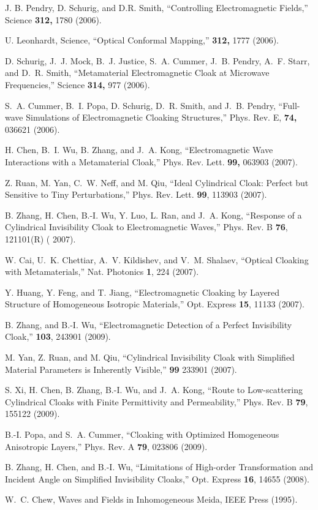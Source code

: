 \documentclass[a4paper, 12pt]{article}
\begin{document}
\begin{thebibliography}{99}

 J. B. Pendry, D. Schurig, and D.R. Smith,  ``Controlling Electromagnetic Fields,'' Science {\bf 312,} 1780 (2006).

 U. Leonhardt, Science, ``Optical Conformal Mapping,''  {\bf 312,} 1777 (2006).

 D. Schurig, J.~J. Mock, B.~J. Justice, S.~A. Cummer, J.~B. Pendry, A.~F. Starr, and D.~R. Smith, ``Metamaterial Electromagnetic Cloak at Microwave Frequencies,'' Science {\bf 314,}
977 (2006).

 S.~A. Cummer, B.~I. Popa, D. Schurig, D.~R. Smith, and J.~B. Pendry, ``Full-wave Simulations of Electromagnetic Cloaking Structures,'' Phys. Rev. E, {\bf 74,} 036621 (2006).

 H. Chen, B.~I. Wu, B. Zhang, and J.~A. Kong, ``Electromagnetic Wave Interactions with a Metamaterial Cloak,'' Phys. Rev. Lett. {\bf 99,} 063903 (2007).

 Z. Ruan, M. Yan, C.~W. Neff, and M. Qiu, ``Ideal Cylindrical Cloak: Perfect but Sensitive to Tiny Perturbations,'' Phys. Rev. Lett. {\bf 99}, 113903 (2007).

 B. Zhang, H. Chen, B.-I. Wu, Y. Luo, L. Ran, and J.~A. Kong, ``Response of a Cylindrical Invisibility Cloak to Electromagnetic Waves,'' Phys. Rev. B {\bf 76}, 121101(R) ( 2007).

 W. Cai, U.~K. Chettiar, A.~V. Kildishev, and V.~M. Shalaev, ``Optical Cloaking with Metamaterials,'' Nat. Photonics {\bf 1}, 224 (2007).

 Y. Huang, Y. Feng, and T. Jiang, ``Electromagnetic Cloaking by Layered Structure of
Homogeneous Isotropic Materials,'' Opt. Express {\bf 15}, 11133
(2007).

 B. Zhang, and B.-I. Wu, 
``Electromagnetic Detection of a Perfect Invisibility Cloak,''  {\bf 103}, 243901
(2009).

 M. Yan, Z. Ruan, and M. Qiu, ``Cylindrical Invisibility Cloak with Simplified Material Parameters is Inherently Visible,''  {\bf 99} 233901 (2007).


 S. Xi, H. Chen, B. Zhang, B.-I. Wu, and J.~A. Kong, ``Route to Low-scattering Cylindrical Cloaks with Finite Permittivity and Permeability,'' Phys. Rev. B {\bf 79}, 155122 (2009).

 B.-I. Popa, and S.~A. Cummer, ``Cloaking with Optimized Homogeneous Anisotropic Layers,''  Phys. Rev. A {\bf 79}, 023806 (2009).


 B. Zhang, H. Chen, and B.-I. Wu, ``Limitations of High-order
Transformation and Incident Angle on Simplified Invisibility
Cloaks,'' Opt. Express {\bf 16}, 14655 (2008).

 W.~C. Chew, Waves and Fields in Inhomogeneous Meida,  IEEE Press (1995).





\end{thebibliography}
\end{document}
